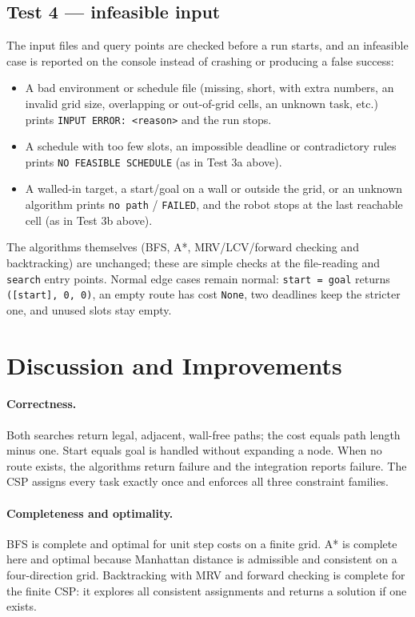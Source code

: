 \documentclass[11pt,a4paper]{article}
\newcommand{\code}[1]{\texttt{#1}}
\begin{document}
\subsection{Test 4 --- infeasible input}

The input files and query points are checked before a run starts, and an infeasible case is
reported on the console instead of crashing or producing a false success:

\begin{itemize}[leftmargin=1.2cm]
  \item A bad environment or schedule file (missing, short, with extra numbers, an invalid grid
        size, overlapping or out-of-grid cells, an unknown task, etc.) prints
        \code{INPUT ERROR: <reason>} and the run stops.
  \item A schedule with too few slots, an impossible deadline or contradictory rules prints
        \code{NO FEASIBLE SCHEDULE} (as in Test 3a above).
  \item A walled-in target, a start/goal on a wall or outside the grid, or an unknown algorithm
        prints \code{no path} / \code{FAILED}, and the robot stops at the last reachable cell
        (as in Test 3b above).
\end{itemize}

The algorithms themselves (BFS, A*, MRV/LCV/forward checking and backtracking) are unchanged;
these are simple checks at the file-reading and \code{search} entry points. Normal edge cases
remain normal: \code{start = goal} returns \code{([start], 0, 0)}, an empty route has cost
\code{None}, two deadlines keep the stricter one, and unused slots stay empty.

\section{Discussion and Improvements}

\paragraph{Correctness.} Both searches return legal, adjacent, wall-free paths; the cost equals
path length minus one. Start equals goal is handled without expanding a node. When no route
exists, the algorithms return failure and the integration reports failure. The CSP assigns
every task exactly once and enforces all three constraint families.

\paragraph{Completeness and optimality.} BFS is complete and optimal for unit step costs on a
finite grid. A* is complete here and optimal because Manhattan distance is admissible and
consistent on a four-direction grid. Backtracking with MRV and forward checking is complete for
the finite CSP: it explores all consistent assignments and returns a solution if one exists.
\end{document}
